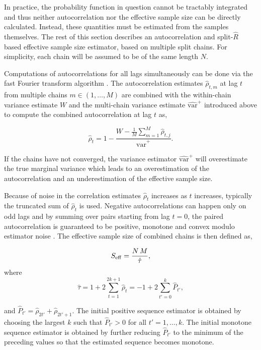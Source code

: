 \documentclass[american,]{article}
\begin{document}
In practice, the probability function in question cannot be tractably
integrated and thus neither autocorrelation nor the effective sample
size can be directly calculated. Instead, these quantities must be estimated from
the samples themselves. The rest of this section describes an
autocorrelation and split-\(\widehat{R}\) based effective sample size
estimator, based on multiple split chains. For simplicity, each chain
will be assumed to be of the same length \(N\).

Computations of autocorrelations for all lags simultaneously can be done
via the fast Fourier transform algorithm \citep[FFT; see][]{Geyer:2011}. The autocorrelation estimates \(\hat{\rho}_{t,m}\)
at lag \(t\) from multiple chains \(m \in (1,\ldots,M)\) are combined
with the within-chain variance estimate \(W\) and the multi-chain
variance estimate \(\widehat{\mbox{var}}^{+}\) introduced above to
compute the combined autocorrelation at lag \(t\) as,

\begin{equation}
\hat{\rho}_t
= 1 - \frac{\displaystyle W - \textstyle \frac{1}{M}\sum_{m=1}^M 
\hat{\rho}_{t,j}}{\widehat{\mbox{var}}^{+}}. \label{rhohat}
\end{equation}

If the chains have not converged, the variance estimator
\(\widehat{\mbox{var}}^{+}\) will overestimate the true marginal
variance which leads to an overestimation of the autocorrelation and an
underestimation of the effective sample size.

Because of noise in the correlation estimates \(\hat{\rho}_t\) increases
as \(t\) increases, typically the truncated sum of \(\hat{\rho}_t\) is
used. Negative autocorrelations can happen only on odd lags and by
summing over pairs starting from lag \(t=0\), the paired autocorrelation
is guaranteed to be positive, monotone and convex modulo estimator noise
\citep{Geyer:1992, Geyer:2011}. The effective sample size of combined
chains is then defined as,

\begin{equation}
S_{\rm eff} = \frac{N \, M}{\hat{\tau}},
\end{equation} where \begin{equation}
\hat{\tau} = 1 + 2 \sum_{t=1}^{2k+1} \hat{\rho}_t = 
-1 + 2 \sum_{t'=0}^{k} \hat{P}_{t'},
\end{equation}

and \(\hat{P}_{t'}=\hat{\rho}_{2t'}+\hat{\rho}_{2t'+1}\). The initial
positive sequence estimator is obtained by choosing the largest \(k\)
such that \(\hat{P}_{t'}>0\) for all \(t' = 1,\ldots,k\). The initial
monotone sequence estimator is obtained by further reducing
\(\hat{P}_{t'}\) to the minimum of the preceding values so that the
estimated sequence becomes monotone.
\end{document}
